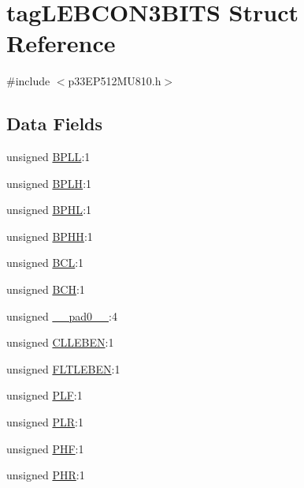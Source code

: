 \hypertarget{structtag_l_e_b_c_o_n3_b_i_t_s}{}\section{tag\+L\+E\+B\+C\+O\+N3\+B\+I\+TS Struct Reference}
\label{structtag_l_e_b_c_o_n3_b_i_t_s}


{\ttfamily \#include $<$p33\+E\+P512\+M\+U810.\+h$>$}

\subsection*{Data Fields}
\begin{DoxyCompactItemize}
\item 
unsigned \hyperlink{structtag_l_e_b_c_o_n3_b_i_t_s_a734b807d032fa494468c04783b84279d}{B\+P\+LL}\+:1
\item 
unsigned \hyperlink{structtag_l_e_b_c_o_n3_b_i_t_s_ab92bd28ed3161199870cae9dca9d8264}{B\+P\+LH}\+:1
\item 
unsigned \hyperlink{structtag_l_e_b_c_o_n3_b_i_t_s_ab1b78e048d280a836358a465b1670e7a}{B\+P\+HL}\+:1
\item 
unsigned \hyperlink{structtag_l_e_b_c_o_n3_b_i_t_s_a8fd804263987e931f779f124751138e1}{B\+P\+HH}\+:1
\item 
unsigned \hyperlink{structtag_l_e_b_c_o_n3_b_i_t_s_acead45594aa9d4a55a37f37fdcc3f0a0}{B\+CL}\+:1
\item 
unsigned \hyperlink{structtag_l_e_b_c_o_n3_b_i_t_s_a485d688549b456635ec3ac860ad7cdaf}{B\+CH}\+:1
\item 
unsigned \hyperlink{structtag_l_e_b_c_o_n3_b_i_t_s_adf71f3d8410c1f1dbbc96680a92c49af}{\+\_\+\+\_\+pad0\+\_\+\+\_\+}\+:4
\item 
unsigned \hyperlink{structtag_l_e_b_c_o_n3_b_i_t_s_a4ec62ac7ec38a6cf1ca2276db69912a9}{C\+L\+L\+E\+B\+EN}\+:1
\item 
unsigned \hyperlink{structtag_l_e_b_c_o_n3_b_i_t_s_aa96ca2430a7a6200927f390d1aa0b21a}{F\+L\+T\+L\+E\+B\+EN}\+:1
\item 
unsigned \hyperlink{structtag_l_e_b_c_o_n3_b_i_t_s_ab72be8b35e01107182afb8e9733d72bb}{P\+LF}\+:1
\item 
unsigned \hyperlink{structtag_l_e_b_c_o_n3_b_i_t_s_a5f690459b53fc81b46dbbac226cecb25}{P\+LR}\+:1
\item 
unsigned \hyperlink{structtag_l_e_b_c_o_n3_b_i_t_s_a4ac425e6c1575269dfa33a0373584fff}{P\+HF}\+:1
\item 
unsigned \hyperlink{structtag_l_e_b_c_o_n3_b_i_t_s_ae02a9c6926c3a1feac21cec18a520e4a}{P\+HR}\+:1
\end{DoxyCompactItemize}


